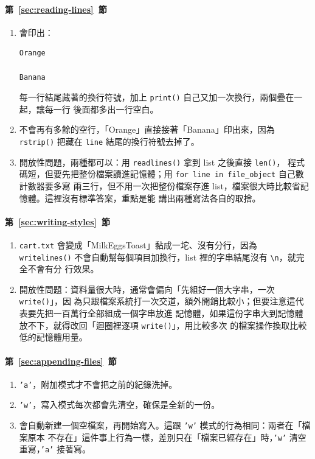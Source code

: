 \paragraph{第~\ref{sec:reading-lines}~節}
\begin{enumerate}
\item 會印出：
\begin{verbatim}
Orange

Banana

\end{verbatim}
每一行結尾藏著的換行符號，加上 \texttt{print()} 自己又加一次換行，兩個疊在一起，讓每一行
後面都多出一行空白。
\item 不會再有多餘的空行，「Orange」直接接著「Banana」印出來，因為 \texttt{rstrip()} 把藏在
\texttt{line} 結尾的換行符號去掉了。
\item 開放性問題，兩種都可以：用 \texttt{readlines()} 拿到 list 之後直接 \texttt{len()}，
程式碼短，但要先把整份檔案讀進記憶體；用 \texttt{for line in file\_object} 自己數計數器要多寫
兩三行，但不用一次把整份檔案存進 list，檔案很大時比較省記憶體。這裡沒有標準答案，重點是能
講出兩種寫法各自的取捨。
\end{enumerate}

\paragraph{第~\ref{sec:writing-styles}~節}
\begin{enumerate}
\item \texttt{cart.txt} 會變成「MilkEggsToast」黏成一坨、沒有分行，因為 \texttt{writelines()}
不會自動幫每個項目加換行，list 裡的字串結尾沒有 \texttt{\textbackslash n}，就完全不會有分
行效果。
\item 開放性問題：資料量很大時，通常會偏向「先組好一個大字串，一次 \texttt{write()}」，因
為只跟檔案系統打一次交道，額外開銷比較小；但要注意這代表要先把一百萬行全部組成一個字串放進
記憶體，如果這份字串大到記憶體放不下，就得改回「迴圈裡逐項 \texttt{write()}」，用比較多次
的檔案操作換取比較低的記憶體用量。
\end{enumerate}

\paragraph{第~\ref{sec:appending-files}~節}
\begin{enumerate}
\item \texttt{'a'}，附加模式才不會把之前的紀錄洗掉。
\item \texttt{'w'}，寫入模式每次都會先清空，確保是全新的一份。
\item 會自動新建一個空檔案，再開始寫入。這跟 \texttt{'w'} 模式的行為相同：兩者在「檔案原本
不存在」這件事上行為一樣，差別只在「檔案已經存在」時，\texttt{'w'} 清空重寫，\texttt{'a'}
接著寫。
\end{enumerate}

